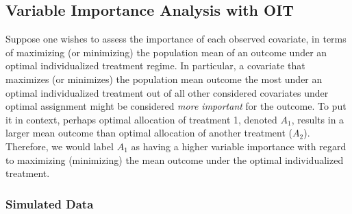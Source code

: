 \documentclass[12pt, krantz2,]{krantz}
\newenvironment{Shaded}{\begin{snugshade}}{\end{snugshade}}
\newcommand{\CommentTok}[1]{\textcolor[rgb]{0.37,0.37,0.37}{\textit{#1}}}
\newcommand{\DataTypeTok}[1]{\textcolor[rgb]{0.27,0.27,0.27}{#1}}
\newcommand{\DecValTok}[1]{\textcolor[rgb]{0.06,0.06,0.06}{#1}}
\newcommand{\FloatTok}[1]{\textcolor[rgb]{0.06,0.06,0.06}{#1}}
\newcommand{\KeywordTok}[1]{\textcolor[rgb]{0.27,0.27,0.27}{\textbf{#1}}}
\newcommand{\NormalTok}[1]{#1}
\newcommand{\OperatorTok}[1]{\textcolor[rgb]{0.43,0.43,0.43}{\textbf{#1}}}
\newcommand{\OtherTok}[1]{\textcolor[rgb]{0.37,0.37,0.37}{#1}}
\newcommand{\StringTok}[1]{\textcolor[rgb]{0.5,0.5,0.5}{#1}}
\theoremstyle{definition}
\theoremstyle{definition}
\theoremstyle{definition}
\newcommand{\1}{\mathbbm{1}}
\begin{document}
\begin{Shaded}
\end{Shaded}

\hypertarget{variable-importance-analysis-with-oit}{%
\subsection{Variable Importance Analysis with OIT}\label{variable-importance-analysis-with-oit}}

Suppose one wishes to assess the importance of each observed covariate, in
terms of maximizing (or minimizing) the population mean of an outcome under an
optimal individualized treatment regime. In particular, a covariate that
maximizes (or minimizes) the population mean outcome the most under an optimal
individualized treatment out of all other considered covariates under optimal
assignment might be considered \emph{more important} for the outcome. To put it in
context, perhaps optimal allocation of treatment 1, denoted \(A_1\), results in a
larger mean outcome than optimal allocation of another treatment (\(A_2\)).
Therefore, we would label \(A_1\) as having a higher variable importance with
regard to maximizing (minimizing) the mean outcome under the optimal
individualized treatment.

\hypertarget{simulated-data-2}{%
\subsubsection{Simulated Data}\label{simulated-data-2}}
\end{document}
